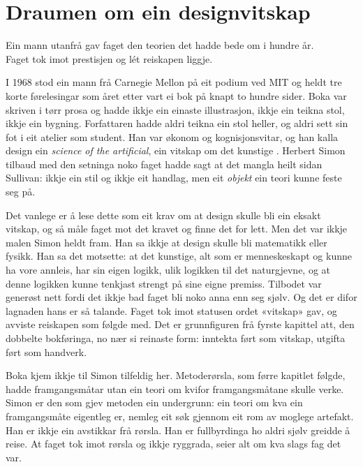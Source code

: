 \chapter{Draumen om ein designvitskap}

\begin{motto}
Ein mann utanfrå gav faget den teorien det hadde bede om i hundre år.\\ Faget tok imot prestisjen og lét reiskapen liggje.
\end{motto}

I 1968 stod ein mann frå Carnegie Mellon på eit podium ved MIT og heldt tre korte førelesingar som året etter vart ei bok på knapt to hundre sider. Boka var skriven i tørr prosa og hadde ikkje ein einaste illustrasjon, ikkje ein teikna stol, ikkje ein bygning. Forfattaren hadde aldri teikna ein stol heller, og aldri sett sin fot i eit atelier som student. Han var økonom og kognisjonsvitar, og han kalla design ein \emph{science of the artificial}, ein vitskap om det kunstige \autocite{simon1969sciences}. Herbert Simon tilbaud med den setninga noko faget hadde sagt at det mangla heilt sidan Sullivan: ikkje ein stil og ikkje eit handlag, men eit \emph{objekt} ein teori kunne feste seg på.

Det vanlege er å lese dette som eit krav om at design skulle bli ein eksakt vitskap, og så måle faget mot det kravet og finne det for lett. Men det var ikkje malen Simon heldt fram. Han sa ikkje at design skulle bli matematikk eller fysikk. Han sa det motsette: at det kunstige, alt som er menneskeskapt og kunne ha vore annleis, har sin eigen logikk, ulik logikken til det naturgjevne, og at denne logikken kunne tenkjast strengt på sine eigne premiss. Tilbodet var generøst nett fordi det ikkje bad faget bli noko anna enn seg sjølv. Og det er difor lagnaden hans er så talande. Faget tok imot statusen ordet «vitskap» gav, og avviste reiskapen som følgde med. Det er grunnfiguren frå fyrste kapittel att, den dobbelte bokføringa, no nær si reinaste form: inntekta ført som vitskap, utgifta ført som handverk.

Boka kjem ikkje til Simon tilfeldig her. Metoderørsla, som førre kapitlet følgde, hadde framgangsmåtar utan ein teori om kvifor framgangsmåtane skulle verke. Simon er den som gjev metoden ein undergrunn: ein teori om kva ein framgangsmåte eigentleg er, nemleg eit søk gjennom eit rom av moglege artefakt. Han er ikkje ein avstikkar frå rørsla. Han er fullbyrdinga ho aldri sjølv greidde å reise. At faget tok imot rørsla og ikkje ryggrada, seier alt om kva slags fag det var.

